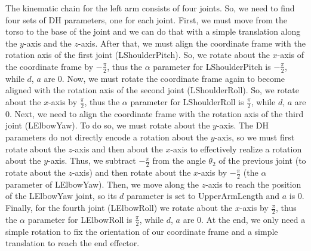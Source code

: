 The kinematic chain for the left arm consists of four joints. So, we need to find four sets of DH parameters, one for each joint. First, we must move from the torso to the base of the joint and we can do that with a simple translation along the $y$-axis and the $z$-axis. After that, we must align the coordinate frame with the rotation axis of the first joint (LShoulderPitch). So, we rotate about the $x$-axis of the coordinate frame by $-\frac{\pi}{2}$, thus the $\alpha$ parameter for LShoulderPitch is $-\frac{\pi}{2}$, while $d$, $a$ are $0$. Now, we must rotate the coordinate frame again to become aligned with the rotation axis of the second joint (LShoulderRoll). So, we rotate about the $x$-axis by $\frac{\pi}{2}$, thus the $\alpha$ parameter for LShoulderRoll is $\frac{\pi}{2}$, while $d$, $a$ are $0$. Next, we need to align the coordinate frame with the rotation axis of the third joint (LElbowYaw). To do so, we must rotate about the $y$-axis. The DH parameters do not directly encode a rotation about the $y$-axis, so we must first rotate about the $z$-axis and then about the $x$-axis to effectively realize a rotation about the $y$-axis. Thus, we subtract $-\frac{\pi}{2}$ from the angle $\theta_2$ of the previous joint (to rotate about the $z$-axis) and then rotate about the $x$-axis by $-\frac{\pi}{2}$ (the $\alpha$ parameter of LElbowYaw). Then, we move along the $z$-axis to reach the position of the LElbowYaw joint, so its $d$ parameter is set to UpperArmLength and $a$ is $0$. Finally, for the fourth joint (LElbowRoll) we rotate about the $x$-axis by $\frac{\pi}{2}$, thus the $\alpha$ parameter for LElbowRoll is $\frac{\pi}{2}$, while $d$, $a$ are $0$. At the end, we only need a simple rotation to fix the orientation of our coordinate frame and a simple translation to reach the end effector.



